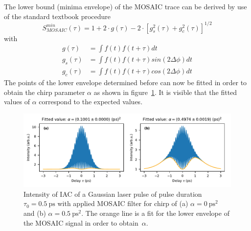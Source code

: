 The lower bound (minima envelope) of the MOSAIC trace can be derived by use of the standard textbook procedure~\cite{klein_optics_1986}
\begin{equation}
S^{min}_{MOSAIC}(\tau)= 1 + 2 \cdot g(\tau) - 2 \cdot [g_s^2(\tau)+g_c^2(\tau)]^{1/2}
\end{equation}
with
\begin{align}
g(\tau)&=\int f(t)f(t+\tau)dt\\
g_s(\tau)&=\int f(t)f(t+\tau)sin(2\Delta\phi)dt\\
g_c(\tau)&=\int f(t)f(t+\tau)cos(2\Delta\phi)dt
\end{align}
The points of the lower envelope determined before can now be fitted in order to obtain the chirp parameter $\alpha$ as shown in figure~\ref{fig:mosaicchirpedlaserpulsefitenvelope}.
It is visible that the fitted values of $\alpha$ correspond to the expected values.
\begin{figure}[H]
	\centering
	\includegraphics[width=\linewidth]{figures/chirp/plots/mosaic_chirped_laser_pulse_fit_envelope}
	\caption[Intensity of IAC of a Gaussian laser pulse of pulse duration $\tau_0=\SI{0.5}{\pico \second}$ with applied MOSAIC filter and fitted $\alpha$-values.]{Intensity of IAC of a Gaussian laser pulse of pulse duration $\tau_0=\SI{0.5}{\pico \second}$ with applied MOSAIC filter for chirp of (a) $\alpha = \SI{0}{\pico \second \squared}$ and (b) $\alpha = \SI{0.5}{\pico \second \squared}$.
		The orange line is a fit for the lower envelope of the MOSAIC signal in order to obtain~$\alpha$.}
	\label{fig:mosaicchirpedlaserpulsefitenvelope}
\end{figure}

